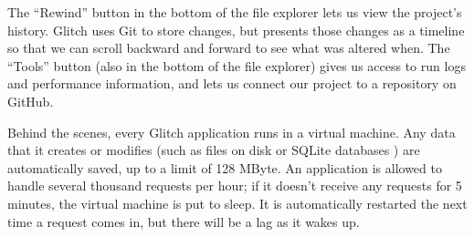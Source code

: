 The ``Rewind'' button in the bottom of the file explorer lets us view the project's history.
Glitch uses Git to store changes,
but presents those changes as a timeline
so that we can scroll backward and forward to see what was altered when.
The ``Tools'' button (also in the bottom of the file explorer)
gives us access to run logs and performance information,
and lets us connect our project to a repository on GitHub.

Behind the scenes,
every Glitch application runs in a virtual machine.
Any data that it creates or modifies
(such as files on disk or SQLite databases ) are automatically saved,
up to a limit of 128 MByte.
An application is allowed to handle several thousand requests per hour;
if it doesn't receive any requests for 5 minutes,
the virtual machine is put to sleep.
It is automatically restarted the next time a request comes in,
but there will be a lag as it wakes up.
